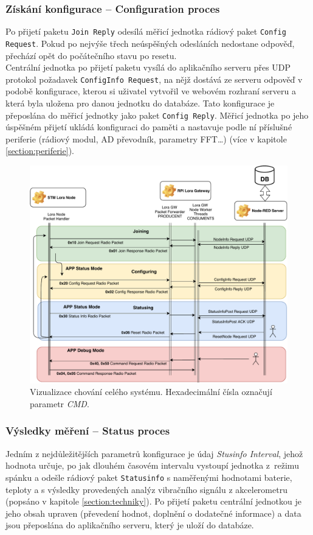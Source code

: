     \subsubsection{Získání konfigurace – Configuration proces}
    \label{section:configuring}
    Po přijetí paketu \texttt{Join Reply} odesílá měřicí jednotka rádiový paket \texttt{Config Request}. Pokud po nejvýše třech neúspěšných odesláních nedostane odpověď, přechází opět do počátečního stavu po resetu.\\
    Centrální jednotka po přijetí paketu vysílá do aplikačního serveru přes UDP protokol požadavek \texttt{ConfigInfo Request}, na nějž dostává ze serveru odpověď v podobě konfigurace, kterou si uživatel vytvořil ve webovém rozhraní serveru a která byla uložena pro danou jednotku do databáze. Tato konfigurace je přeposlána do měřicí jednotky jako paket \texttt{Config Reply}.  Měřicí jednotka po jeho úspěšném přijetí ukládá konfiguraci do paměti a nastavuje podle ní příslušné periferie (rádiový modul, AD převodník, parametry FFT\ldots) (více v kapitole \ref{section:periferie}).
    
    \begin{figure}[!ht]
        \centering
	    \includegraphics[width =1.1\textwidth]{SW_PART/Figs/app.pdf}
        \caption {Vizualizace chování celého systému. Hexadecimální čísla označují parametr \textit{CMD}.}
        \label{figure:app}
    \end{figure}  
    
    \subsubsection{Výsledky měření – Status proces}
    Jedním z nejdůležitějších parametrů konfigurace je údaj \textit{Stusinfo Interval}, jehož hodnota určuje, po jak dlouhém časovém intervalu vystoupí jednotka z~režimu spánku a odešle rádiový paket \texttt{Statusinfo} s naměřenými hodnotami baterie, teploty a s výsledky provedených analýz vibračního signálu z akcelerometru (popsáno v kapitole \ref{section:techniky}). Po přijetí paketu centrální jednotkou je jeho obsah upraven (převedení hodnot, doplnění o dodatečné informace) a data jsou přeposlána do aplikačního serveru, který je uloží do databáze.
    
